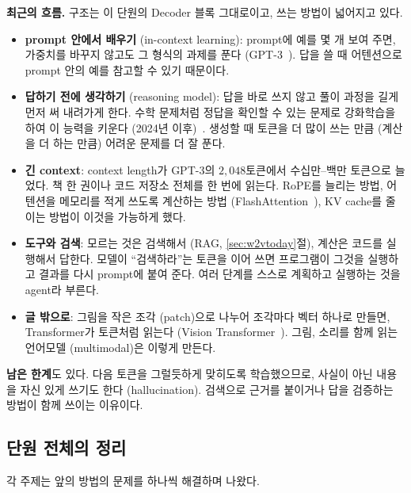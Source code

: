 \documentclass[11pt,a4paper]{article}
\begin{document}
\textbf{최근의 흐름.} 구조는 이 단원의 Decoder 블록 그대로이고, 쓰는 방법이 넓어지고 있다.
\begin{itemize}[leftmargin=1.5em]
\item \textbf{prompt 안에서 배우기} (in-context learning): prompt에 예를 몇 개 보여 주면, 가중치를 바꾸지 않고도 그 형식의 과제를 푼다 (GPT-3~\cite{brown2020}). 답을 쓸 때 어텐션으로 prompt 안의 예를 참고할 수 있기 때문이다.
\item \textbf{답하기 전에 생각하기} (reasoning model): 답을 바로 쓰지 않고 풀이 과정을 길게 먼저 써 내려가게 한다. 수학 문제처럼 정답을 확인할 수 있는 문제로 강화학습을 하여 이 능력을 키운다 (2024년 이후)~\cite{deepseek2025}.
생성할 때 토큰을 더 많이 쓰는 만큼 (계산을 더 하는 만큼) 어려운 문제를 더 잘 푼다.
\item \textbf{긴 context}: context length가 GPT-3의 $2{,}048$토큰에서 수십만--백만 토큰으로 늘었다. 책 한 권이나 코드 저장소 전체를 한 번에 읽는다. RoPE를 늘리는 방법, 어텐션을 메모리를 적게 쓰도록 계산하는 방법 (FlashAttention~\cite{dao2022}), KV cache를 줄이는 방법이 이것을 가능하게 했다.
\item \textbf{도구와 검색}: 모르는 것은 검색해서 (RAG, \ref{sec:w2vtoday}절), 계산은 코드를 실행해서 답한다. 모델이 ``검색하라''는 토큰을 이어 쓰면 프로그램이 그것을 실행하고 결과를 다시 prompt에 붙여 준다. 여러 단계를 스스로 계획하고 실행하는 것을 agent라 부른다.
\item \textbf{글 밖으로}: 그림을 작은 조각 (patch)으로 나누어 조각마다 벡터 하나로 만들면, Transformer가 토큰처럼 읽는다 (Vision Transformer~\cite{dosovitskiy2021}). 그림, 소리를 함께 읽는 언어모델 (multimodal)은 이렇게 만든다.
\end{itemize}
\textbf{남은 한계}도 있다. 다음 토큰을 그럴듯하게 맞히도록 학습했으므로, 사실이 아닌 내용을 자신 있게 쓰기도 한다 (hallucination). 검색으로 근거를 붙이거나 답을 검증하는 방법이 함께 쓰이는 이유이다.

\subsection{단원 전체의 정리}

각 주제는 앞의 방법의 문제를 하나씩 해결하며 나왔다.
\end{document}
